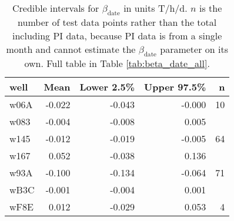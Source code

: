 \begin{table}[]
\centering
\begin{tabular}{lrrrr}
  \hline
well & Mean & Lower 2.5\% & Upper 97.5\% & n \\ 
  \hline
w06A & -0.022 & -0.043 & -0.000 &   10 \\ 
  w083 & -0.004 & -0.008 & 0.005 &  \\ 
  w145 & -0.012 & -0.019 & -0.005 &   64 \\ 
  w167 & 0.052 & -0.038 & 0.136 &  \\ 
  w93A & -0.100 & -0.134 & -0.064 &   71 \\ 
  wB3C & -0.001 & -0.004 & 0.001 &  \\ 
  wF8E & 0.012 & -0.029 & 0.053 &    4 \\ 
   \hline
\end{tabular}
\caption{Credible intervals for $\beta_\text{date}$ in units T/h/d. $n$ is the number of test data points rather than the total including PI data, because PI data is from a single month and cannot estimate the $\beta_\text{date}$ parameter on its own. Full table in Table \ref{tab:beta_date_all}.} 
\label{tab:beta_date}
\end{table}
